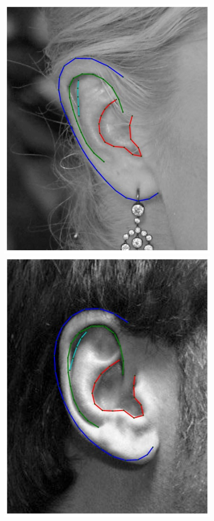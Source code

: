 \begin{figure}[!t]
    \\
    \includegraphics[height=\flowh]{resources/Ear_Deformable_Model/fittings/final_0000}
    \includegraphics[height=\flowh]{resources/Ear_Deformable_Model/fittings/final_0001}

\end{figure}
